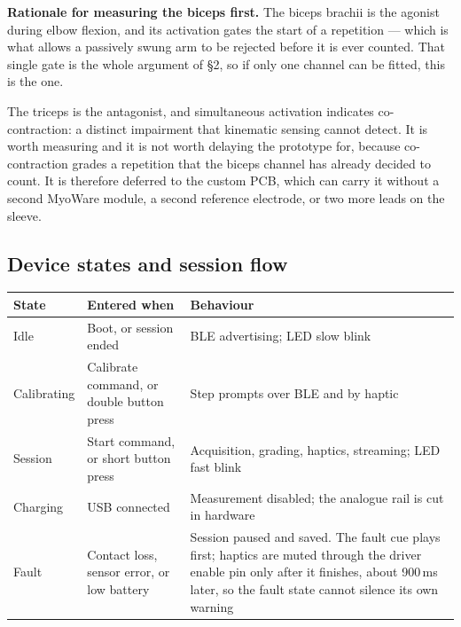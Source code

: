 \documentclass[11pt]{article}
\begin{document}
\noindent
\textbf{Rationale for measuring the biceps first.} The biceps brachii is the
agonist during elbow flexion, and its activation gates the start of a
repetition --- which is what allows a passively swung arm to be rejected before
it is ever counted. That single gate is the whole argument of \S2, so if only
one channel can be fitted, this is the one.

\medskip
\noindent
The triceps is the antagonist, and simultaneous activation indicates
co-contraction: a distinct impairment that kinematic sensing cannot detect. It
is worth measuring and it is not worth delaying the prototype for, because
co-contraction grades a repetition that the biceps channel has already decided
to count. It is therefore deferred to the custom PCB, which can carry it
without a second MyoWare module, a second reference electrode, or two more
leads on the sleeve.

\subsection{Device states and session flow}

\begin{table}[H]
\centering\small
\begin{tabularx}{\linewidth}{@{}p{24mm} p{44mm} X@{}}
\toprule
\textbf{State} & \textbf{Entered when} & \textbf{Behaviour} \\
\midrule
Idle & Boot, or session ended & BLE advertising; LED slow blink \\
Calibrating & Calibrate command, or double button press & Step prompts over BLE and by haptic \\
Session & Start command, or short button press & Acquisition, grading, haptics, streaming; LED fast blink \\
Charging & USB connected & Measurement disabled; the analogue rail is cut in hardware \\
Fault & Contact loss, sensor error, or low battery & Session paused and saved. The fault cue plays first; haptics are muted through the driver enable pin only after it finishes, about 900\,ms later, so the fault state cannot silence its own warning \\
\bottomrule
\end{tabularx}
\end{table}
\end{document}
